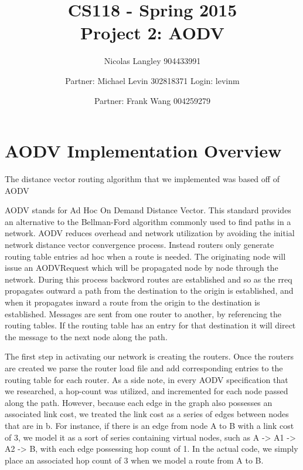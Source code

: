 \documentclass[12pt, titlepage]{article}
\begin{document}
\title{CS118 - Spring 2015 \\
Project 2: AODV}
\author{Nicolas Langley 904433991 \and Partner: Michael Levin 302818371 Login: levinm \and Partner: Frank Wang 004259279}

\maketitle
\section{AODV Implementation Overview}

The distance vector routing algorithm that we implemented was based off of AODV

AODV stands for Ad Hoc On Demand Distance Vector.
This standard provides an alternative to the Bellman-Ford algorithm commonly used to find paths in a network.
AODV reduces overhead and network utilization by avoiding the initial network distance vector convergence process.
Instead routers only generate routing table entries ad hoc when a route is needed.  The originating node will issue an AODVRequest which will be propagated node by node through the network. During this process backword routes are established and so as the rreq propagates outward a path from the destination to the origin is established, and when it propagates inward a route from the origin to the destination is established.  Messages are sent from one router to another, by referencing the routing tables.  If the routing table has an entry for that destination it will direct the message to the next node along the path.

The first step in activating our network is creating the routers. Once the routers are created we parse the router load file and add corresponding entries to the routing table for each router. As a side note, in every AODV 
specification that we researched, a hop-count was utilized, and incremented for each node passed along the path. However, because each edge in the graph also possesses an associated link cost, we treated the link cost as a series of edges between nodes that are in b. For instance, if there is an edge from node A to B with a link cost of 3, we model it as a sort of series containing virtual nodes, such as A -> A1 -> A2 -> B, with each edge possessing hop count of 1. In the actual code, we simply place an associated hop count of 3 when we model a route from A to B. 
\end{document}
